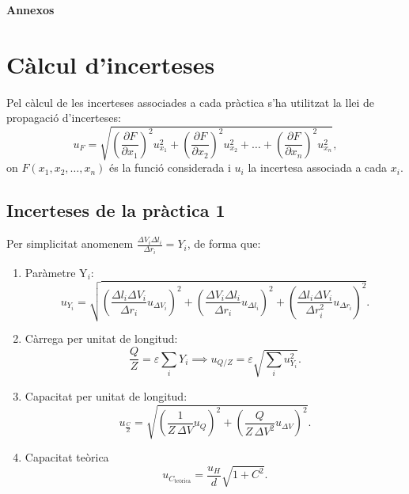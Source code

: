 \documentclass[a4paper,10.5pt]{report}
\begin{document}
\newpage
\begin{appendices}

\textbf{\Huge{Annexos}}
\renewcommand{\thesection}{\Alph{section}} %
\renewcommand{\theequation}{\thesection.\arabic{equation}} %
\setcounter{equation}{0} %

\section{Càlcul d'incerteses}
\label{an:a3}
Pel càlcul de les incerteses associades a cada pràctica s'ha utilitzat la llei de propagació d'incerteses:
\begin{equation}
	u_F = \sqrt{ \left( \frac{\partial F}{\partial x_1} \right)^2 u_{x_1}^2 + \left( \frac{\partial F}{\partial x_2} \right)^2 u_{x_2}^2 + \dots + \left( \frac{\partial F}{\partial x_n} \right)^2 u_{x_n}^2 },
\end{equation}
on $F(x_1,x_2,\ldots,x_n)$ és la funció considerada i $u_i$ la incertesa associada a cada $x_i$.

\subsection{Incerteses de la pràctica 1}
Per simplicitat anomenem $\frac{\Delta V_i \Delta l_i}{\Delta r_i} = Y_i$, de forma que:
\begin{enumerate}
	\item Paràmetre Y$_i$: \begin{equation}
		u_{Y_i} = \sqrt{ \left( \frac{\Delta l_i \Delta V_i}{\Delta r_i} u_{\Delta V_i} \right)^2 + \left( \frac{\Delta V_i \Delta l_i}{\Delta r_i} u_{\Delta l_i} \right)^2 + \left( \frac{\Delta l_i \Delta V_i}{\Delta r_i^2} u_{\Delta r_i} \right)^2 }.
	\end{equation}
	\item Càrrega per unitat de longitud:\begin{equation}
		\frac{Q}{Z} = \varepsilon \sum_i Y_i \implies u_{Q/Z} = \varepsilon \sqrt{\sum_i u_{Y_i}^2}.
	\end{equation}
	\item Capacitat per unitat de longitud:\begin{equation}
		u_{\frac{C}{Z}} = \sqrt{ \left( \frac{1}{Z \, \Delta V} u_Q \right)^2 + \left( \frac{Q}{Z \, \Delta V^2} u_{\Delta V} \right)^2 }.
	\end{equation}
	\item Capacitat teòrica\begin{equation}
		u_{C_\text{teòrica}} = \frac{u_H}{d} \sqrt{1+C^2}.
	\end{equation}
\end{enumerate}

\end{appendices}
\end{document}
